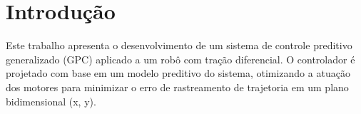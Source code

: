 \section{Introdução}

Este trabalho apresenta o desenvolvimento de um sistema de controle preditivo generalizado (GPC) aplicado a um robô com tração diferencial. 
O controlador é projetado com base em um modelo preditivo do sistema, otimizando a atuação dos motores para minimizar o erro de rastreamento de trajetoria em um plano bidimensional (x, y). 
